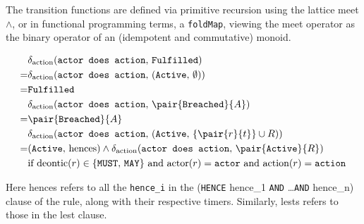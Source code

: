 \documentclass{article}
\begin{document}
The transition functions are defined via primitive recursion using the lattice
meet $\wedge$, or in functional programming terms, a \texttt{foldMap}, viewing
the meet operator as the binary operator of an (idempotent and commutative)
monoid.


\begin{align*}
  & \delta_\text{action}(
    \texttt{actor does action}, \,
    \texttt{Fulfilled}
  )
  \\
  = & \delta_\text{action}(
    \texttt{actor does action}, \,
    (\texttt{Active}, \, \emptyset)
  )
  \\
  = & \texttt{Fulfilled}
  \\
  & \delta_\text{action}(
    \texttt{actor does action}, \,
    \pair{\texttt{Breached}}{A}
  )
  \\
  = & \pair{\texttt{Breached}}{A}
  \\
  & \delta_\text{action}(
    \texttt{actor does action}, \,
    (
      \texttt{Active}, \,
      \{\pair{r}{t}\} \cup R
    )
  )
  \\
  = &
  (
    \texttt{Active}, \,
    \text{hences}
  )
  \wedge
  \delta_\text{action}(\texttt{actor does action}, \, \pair{\texttt{Active}}{R})
  \\
  & \text{if deontic}(r) \in \{\texttt{MUST}, \, \texttt{MAY}\}
  \text{ and } \text{actor}(r) = \texttt{actor}
  \text{ and } \text{action}(r) = \texttt{action}
\end{align*}

Here hences refers to all the \texttt{hence\_i} in the
(\texttt{HENCE} hence\_1 \texttt{AND} \dots \texttt{AND} hence\_n)
clause of the rule, along with their respective timers.
Similarly, lests refers to those in the lest clause.
\end{document}
